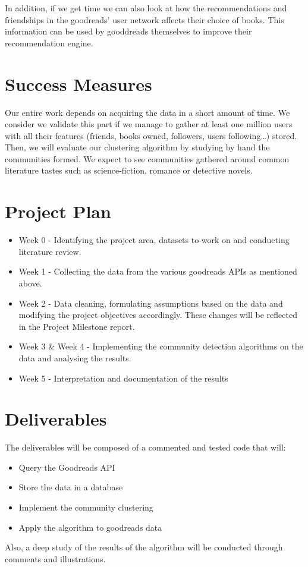 \documentclass[11pt]{article}
\begin{document}
In addition, if we get time we can also look at how the recommendations and friendships in the goodreads' user network affects their choice of books. This information can be used by gooddreads themselves to improve their recommendation engine.

\section{Success Measures}

Our entire work depends on acquiring the data in a short amount of time. We consider we validate this part if we manage to gather at least one million users with all their features (friends, books owned, followers, users following\dots) stored.\\
Then, we will evaluate our clustering algorithm by studying by hand the communities formed. We expect to see communities gathered around common literature tastes such as science-fiction, romance or detective novels. 


\section{Project Plan}
\begin{itemize}
\item Week 0 - Identifying the project area, datasets to work on and conducting literature review.
\item Week 1 -  Collecting the data from the various goodreads APIs as mentioned above.
\item Week 2 -  Data cleaning, formulating assumptions based on the data and modifying the project objectives accordingly. These changes will be reflected in the Project Milestone report.
\item Week 3 \& Week 4 - Implementing the community detection algorithms on the data and analysing the results.
\item Week 5 - Interpretation and documentation of the results
\end{itemize}
\section{Deliverables}

The deliverables will be composed of a commented and tested code that will:
\begin{itemize}
\item Query the Goodreads API
\item Store the data in a database
\item Implement the community clustering
\item Apply the algorithm to goodreads data
\end{itemize}

Also, a deep study of the results of the algorithm will be conducted through comments and illustrations.



\end{document}
